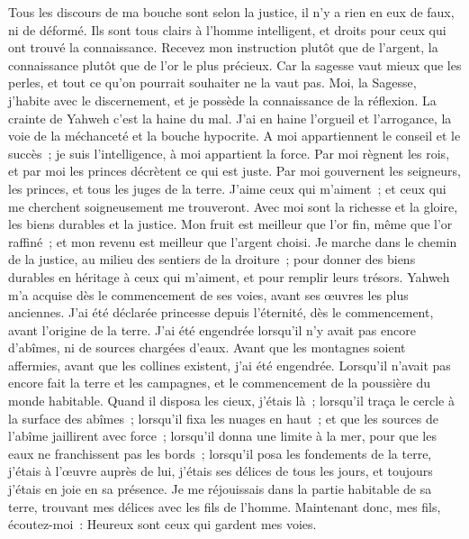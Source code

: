 \begin{multicols}{2}
Tous les discours de ma bouche sont selon la justice, il n'y a rien en eux de faux, ni de déformé.
Ils sont tous clairs à l'homme intelligent, et droits pour ceux qui ont trouvé la connaissance.
Recevez mon instruction plutôt que de l'argent, la connaissance plutôt que de l'or le plus précieux.
Car la sagesse vaut mieux que les perles, et tout ce qu'on pourrait souhaiter ne la vaut pas.
Moi, la Sagesse, j'habite avec le discernement, et je possède la connaissance de la réflexion.
La crainte de Yahweh c'est la haine du mal. J'ai en haine l'orgueil et l'arrogance, la voie de la méchanceté et la bouche hypocrite.
A moi appartiennent le conseil et le succès~; je suis l'intelligence, à moi appartient la force.
Par moi règnent les rois, et par moi les princes décrètent ce qui est juste.
Par moi gouvernent les seigneurs, les princes, et tous les juges de la terre.
J'aime ceux qui m'aiment~; et ceux qui me cherchent soigneusement me trouveront.
Avec moi sont la richesse et la gloire, les biens durables et la justice.
Mon fruit est meilleur que l'or fin, même que l'or raffiné~; et mon revenu est meilleur que l'argent choisi.
Je marche dans le chemin de la justice, au milieu des sentiers de la droiture~;
pour donner des biens durables en héritage à ceux qui m'aiment, et pour remplir leurs trésors.
Yahweh m'a acquise dès le commencement de ses voies, avant ses œuvres les plus anciennes.
J'ai été déclarée princesse depuis l'éternité, dès le commencement, avant l'origine de la terre.
J'ai été engendrée lorsqu'il n'y avait pas encore d'abîmes, ni de sources chargées d'eaux.
Avant que les montagnes soient affermies, avant que les collines existent, j'ai été engendrée.
Lorsqu'il n'avait pas encore fait la terre et les campagnes, et le commencement de la poussière du monde habitable.
Quand il disposa les cieux, j'étais là~; lorsqu'il traça le cercle à la surface des abîmes~;
lorsqu'il fixa les nuages en haut~; et que les sources de l'abîme jaillirent avec force~;
lorsqu'il donna une limite à la mer, pour que les eaux ne franchissent pas les bords~; lorsqu'il posa les fondements de la terre,
j'étais à l'œuvre auprès de lui, j'étais ses délices de tous les jours, et toujours j'étais en joie en sa présence.
Je me réjouissais dans la partie habitable de sa terre, trouvant mes délices avec les fils de l'homme.
Maintenant donc, mes fils, écoutez-moi~: Heureux sont ceux qui gardent mes voies.

\end{multicols}
